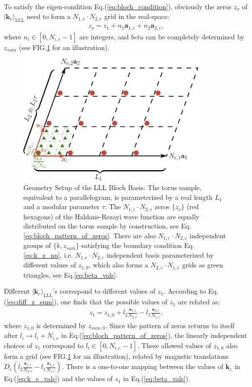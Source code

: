 To satisfy the eigen-condition Eq.(\ref{eq:bloch_condition}), obviously the zeros $z_\nu$ of $|\mathbf k_e\rangle_{\text{LLL}}$ need to form a $N_{1,e}\cdot N_{2,e}$ grid in the real-space:
\begin{align}
z_\nu=z_1+n_1 \mathbf a_{1,e}+ n_2 \mathbf a_{2,e},\label{eq:bloch_pattern_of_zeros}
\end{align}
where $n_i \in [0,N_{i,e}-1]$ are integers, and $beta$ can be completely determined by $z_{sum}$ (see FIG.\ref{fig:LLL_bloch_basis} for an illustration).
\begin{figure}
    \centering
    \includegraphics[width=0.85\textwidth]{contents/FCI_ProjWfc/figures/Haldane_Rezayi.pdf}
    \caption{Geometry Setup of the LLL Bloch Basis: The torus sample, equivalent to a parallelogram, is parameterized by a real length $L_1$ and a modular parameter $\tau$. The $N_{1,e}\cdot N_{2,e}$ zeros $\{z_\nu\}$ (red hexagons) of the Haldane-Rezayi wave function are equally distributed on the torus sample by construction, see Eq.\eqref{eq:bloch_pattern_of_zeros}. There are also $N_{1,e}\cdot N_{2,e}$ independent groups of $\{k, z_{sum}\}$ satisfying the boundary condition Eq.\eqref{eq:k_z_nu}, i.e. $N_{1,e}\cdot N_{2,e}$ independent basis parameterized by different values of $z_{1,0}$, which also forms a $N_{2,e}\cdot N_{1,e}$ grids as green triangles, see Eq.\eqref{eq:beta_vals}.}
    \label{fig:LLL_bloch_basis}
\end{figure}
Different $|\mathbf k_e\rangle_{\text{LLL}}$'s correspond to different values of $z_1$. According to Eq.(\ref{eq:diff_z_sum}), one finds that the possible values of $z_1$ are related as:
\begin{align}
z_1=z_{1,0}+l_2\frac{\mathbf a_{1,e}}{N_{2,e}}-l_1\frac{\mathbf a_{2,e}}{N_{1,e}}, \label{eq:beta_vals}
\end{align}
where $z_{1,0}$ is determined by $z_{sum,0}$. Since the pattern of zeros returns to itself after $l_i\rightarrow l_i+N_{i,e}$ in Eq.(\ref{eq:bloch_pattern_of_zeros}), the linearly independent choices of $z_1$ correspond to $l_i\in [0,N_{i,e}-1]$. These allowed values of $z_{1,0}$ also form a grid (see FIG.\ref{fig:LLL_bloch_basis} for an illustration), related by magnetic translations $D_e(l_2\frac{\mathbf a_{1,e}}{N_{2,e}}-l_1\frac{\mathbf a_{2,e}}{N_{1,e}})$. There is a one-to-one mapping between the values of $\mathbf k_e$ in Eq.(\ref{eq:k_e_vals}) and the values of $z_1$ in Eq.(\ref{eq:beta_vals}).

